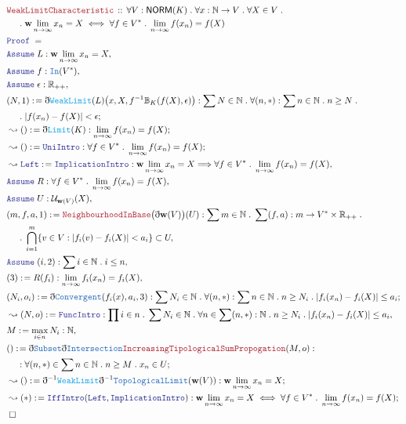 \documentclass[12pt]{scrartcl}
\newcommand{\TYPE}[1]{\textcolor{NavyBlue}{\mathtt{#1}}}
\newcommand{\FUNC}[1]{\textcolor{Cerulean}{\mathtt{#1}}}
\newcommand{\LOGIC}[1]{\textcolor{Blue}{\mathtt{#1}}}
\newcommand{\THM}[1]{\textcolor{Maroon}{\mathtt{#1}}}
\renewcommand{\.}{\; . \;}
\newcommand{\de}{: \kern 0.1pc =}
\newcommand{\Theorem}[2]{& \THM{#1} \, :: \, #2 \\ & \Proof = \\ }
\newcommand{\NewLine}{\\ & \kern 1pc}
\newcommand{\Page}[1]{\begin{align*} #1 \end{align*} \newpage   }
\newcommand{ \bd }{ \ByDef }
\newcommand{\Reals}{\mathbb{R} }
\newcommand{\Nat}{\mathbb{N} }
\newcommand{\Say}[3]{& #1 \de #2 : #3, \\}
\newcommand{\Conclude}[3]{& #1 \de #2 : #3; \\}
\newcommand{\Derive}[3]{& \leadsto #1 \de #2 : #3, \\}
\newcommand{\DeriveConclude}[3]{& \leadsto #1 \de #2 : #3 ; \\}
\newcommand{\A}{\LOGIC{Assume} \;}
\newcommand{\Assume}[2]{& \A #1 : #2, \\}
\newcommand{\QED}{\; \square}
\newcommand{\EndProof}{& \QED \\}
\newcommand{\ByDef}{\eth}
\newcommand{\Proof}{\LOGIC{Proof} \; }
\newcommand{\NORM}{\textsf{NORM}}
\begin{document}
\Page{
\Theorem{WeakLimitCharacteristic}{\forall V : \NORM(K) \. \forall x : \Nat \to V \. \forall X \in V
 \. \NewLine \.
 \mathbf{w} \- \lim_{n \to \infty} x_n = X \iff  \forall f \in V^* \. \lim_{n \to \infty} f(x_n) = f(X)}
\Assume{L}{\mathbf{w} \- \lim_{n \to \infty} x_n = X }
\Assume{f}{\TYPE{In}(V^*)}
\Assume{\epsilon}{\Reals_{++}}
\Conclude{(N,1)}{\bd \FUNC{WeakLimit}(L)\big(x,X,f^{-1}\mathbb{B}_K(f(X),\epsilon)\big)}{ \sum N \in \Nat \. \forall (n,*) : \sum n \in \Nat \. n \ge N \.  \NewLine \. |f(x_n) - f(X)| < \epsilon   }
\DeriveConclude{()}{\bd \FUNC{Limit}(K)}{\lim_{n \to \infty} f(x_n) = f(X)}
\DeriveConclude{()}{\LOGIC{UniIntro}}{\forall f \in V^* \. 
\lim_{n \to \infty} f(x_n) = f(X) }
\Derive{\LOGIC{Left}}{\LOGIC{ImplicationIntro}}{ \mathbf{w} \- \lim_{n \to \infty} x_n = X \Longrightarrow \forall f \in V^* \. \lim_{n \to \infty} f(x_n) = f(X)}
\Assume{R}{\forall f \in V^* \. \lim_{n \to \infty} f(x_n) = f(X)}
\Assume{U}{ \mathcal{U}_{\mathbf{w}(V)}(X)}
\Say{(m,f,a,1)}{\THM{NeighbourhoodInBase}\big(\bd \mathbf{w}(V)\big)(U)}{\sum m \in \Nat \.  \sum (f,a) : m \to V^* \times \Reals_{++} \. 
\NewLine
\. \bigcap^m_{i = 1}\{ v \in V : |f_i(v) - f_i(X)| < a_i \} \subset U
  }
\Assume{(i,2)}{\sum i \in \Nat \. i \le n }
\Say{(3)}{R(f_i)}{\lim_{n \to \infty} f_i(x_n) = f_i(X)}
\Conclude{(N_i,o_i)}{\bd \TYPE{Convergent}(f_i(x), a_i,3)}{\sum N_i \in \Nat \.  \forall (n,*) : \sum n \in \Nat \. n \ge N_i \. | f_i(x_n) - f_i(X) | \le a_i }
\Derive{(N,o)}{\LOGIC{FuncIntro}}{ \prod i \in n \. \sum N_i \in \Nat \.  \forall n \in \sum (n,*) : \Nat \. n \ge N_i \. | f_i(x_n) - f_i(X) | \le a_i}
\Say{M}{ \max_{i \in n} N_i  }{\Nat}
\Conclude{()}{ \bd \TYPE{Subset} \bd \TYPE{Intersection}\THM{IncreasingTipologicalSumPropogation}(M, o) }{ 
 \NewLine : \forall (n,*) \in \sum n \in \Nat \. n \ge M \. x_n \in U}
\DeriveConclude{()}{\bd^{-1}\FUNC{WeakLimit}\bd^{-1} \TYPE{TopologicalLimit}(\mathbf{w}(V))}{ \mathbf{w}\-\lim_{n \to \infty} x_n = X }
\DeriveConclude{(*)}{\LOGIC{IffIntro}(\LOGIC{Left}, \LOGIC{ImplicationIntro})}
{\mathbf{w} \- \lim_{n \to \infty} x_n = X \iff  \forall f \in V^* \. \lim_{n \to \infty} f(x_n) = f(X)}
\EndProof
}
\end{document}
